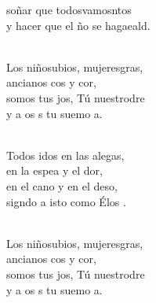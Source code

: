 \documentclass[12pt]{article}
\begin{document}
\begin{multicols*}{2}
\begin{cancion}
	soñar que todosvamosntos\\
	y hacer que el ño se hagaeald.\\\jump\\
	\begin{chorus}%
	Los niñosubios, mujeresgras,\\
	ancianos cos y cor,\\
	somos tus jos, Tú nuestrodre\\
	y a os s tu suemo a.\\
	\end{chorus}%
	\jump\\
	Todos idos en las alegas, \\
	en la espea y el dor,\\
	en el cano y en el deso,\\
	signdo a isto como Élos . \\\jump\\
	\begin{chorus}%
	Los niñosubios, mujeresgras,\\
	ancianos cos y cor,\\
	somos tus jos, Tú nuestrodre\\
	y a os s tu suemo a.\\
	\end{chorus}%
	\jump\\
\end{cancion}%


\end{multicols*}
\end{document}
